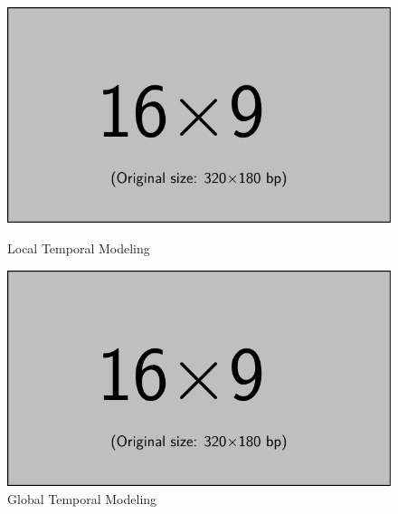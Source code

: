 
\begin{figure}[t]
    \centering
    \begin{minipage}{0.49\textwidth}
        \centering
        \includegraphics[width=\textwidth]{assets/mwe/example-image-16x9}
        \caption{Local Temporal Modeling}
        \label{figure:local-temporal-modeling}
    \end{minipage}
    \hfill
    \begin{minipage}{0.49\textwidth}
        \centering
        \includegraphics[width=\textwidth]{assets/mwe/example-image-16x9}
        \caption{Global Temporal Modeling}
        \label{figure:global-temporal-modeling}
    \end{minipage}
\end{figure}

